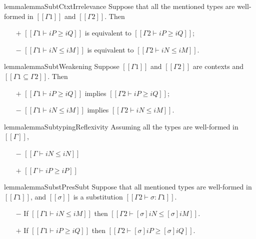 \begin{restatable}{lemma}{lemmaSubtCtxtIrrelevance}
    \label{lemma:subt-ctxt-irrelevance}
    Suppose that all the mentioned types are well-formed in $[[Γ1]]$ and $[[Γ2]]$. 
    Then 
    \begin{enumerate}
        \item[$+$] $[[Γ1 ⊢ iP ≥ iQ]]$ is equivalent to $[[Γ2 ⊢ iP ≥ iQ]]$;
        \item[$-$] $[[Γ1 ⊢ iN ≤ iM]]$ is equivalent to $[[Γ2 ⊢ iN ≤ iM]]$.
    \end{enumerate}
\end{restatable}


\begin{restatable}{lemma}{lemmaSubtWeakening}
    \label{lemma:subt-weakening}
    Suppose $[[Γ1]]$ and $[[Γ2]]$ are contexts 
    and $[[ Γ1 ⊆ Γ2 ]]$.
    Then 
    \begin{enumerate}
        \item [$+$] $[[Γ1 ⊢ iP ≥ iQ]]$ implies $[[Γ2 ⊢ iP ≥ iQ]]$;
        \item [$-$] $[[Γ1 ⊢ iN ≤ iM]]$ implies $[[Γ2 ⊢ iN ≤ iM]]$.
    \end{enumerate}
\end{restatable}


\begin{restatable}{lemma}{lemmaSubtypingReflexivity}
    \label{lemma:subtyping-reflexivity}
    Assuming all the types are well-formed in $[[Γ]]$,
    \begin{itemize}
        \item [$-$] $[[Γ ⊢ iN ≤ iN]]$
        \item [$+$] $[[Γ ⊢ iP ≥ iP]]$
    \end{itemize}
\end{restatable}


\begin{restatable}{lemma}{lemmaSubstPresSubt}
    \label{lemma:subst-pres-subt}
    Suppose that all mentioned types are well-formed in $[[Γ1]]$,
    and $[[σ]]$ is a substitution $[[Γ2 ⊢ σ : Γ1]]$.
    \begin{itemize}
        \item [$-$] If $[[Γ1 ⊢ iN ≤ iM]]$ then $[[Γ2 ⊢ [σ]iN ≤ [σ]iM]]$.
        \item [$+$] If $[[Γ1 ⊢ iP ≥ iQ]]$ then $[[Γ2 ⊢ [σ]iP ≥ [σ]iQ]]$.
    \end{itemize}
\end{restatable}


